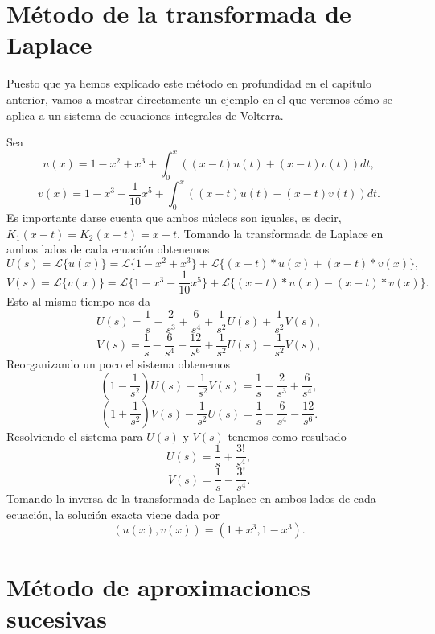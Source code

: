 \section{Método de la transformada de Laplace}
Puesto que ya hemos explicado este método en profundidad en el capítulo anterior, vamos a mostrar directamente un ejemplo en el que veremos cómo se aplica a un sistema de ecuaciones integrales de Volterra.
\begin{ejemplo}
	Sea
	\begin{equation}
		u(x) = 1 - x^2 + x^3 + \int_{0}^{x}((x-t)u(t) + (x-t)v(t))dt,
	\end{equation}
	\begin{equation}
		v(x) = 1 - x^3 - \dfrac{1}{10}x^5 + \int_{0}^{x}((x-t)u(t) - (x-t)v(t))dt.
	\end{equation}
	Es importante darse cuenta que ambos núcleos son iguales, es decir, $K_1(x-t) = K_2(x-t) = x-t$. Tomando la transformada de Laplace en ambos lados de cada ecuación obtenemos
	\begin{equation}
		U(s) = \mathcal{L}\{u(x)\} = \mathcal{L}\{1 - x^2 + x^3\} + \mathcal{L}\{(x-t)\ast u(x) + (x-t) \ast v(x)\},
	\end{equation}
	\begin{equation}
		V(s) = \mathcal{L}\{v(x)\} = \mathcal{L}\{1 - x^3 - \dfrac{1}{10}x^5\} + 	\mathcal{L}\{(x-t)\ast u(x) - (x-t) \ast v(x)\}.
	\end{equation}
	Esto al mismo tiempo nos da
	\begin{equation}
		U(s) = \dfrac{1}{s} - \dfrac{2}{s^3} + \dfrac{6}{s^4} + \dfrac{1}{s^2}U(s) + \dfrac{1}{s^2}V(s),
	\end{equation}
	\begin{equation}
		V(s) = \dfrac{1}{s} - \dfrac{6}{s^4} - \dfrac{12}{s^6} + \dfrac{1}{s^2}U(s) 	- \dfrac{1}{s^2}V(s),
	\end{equation}
	Reorganizando un poco el sistema obtenemos
	\begin{equation}
		(1-\dfrac{1}{s^2})U(s) - \dfrac{1}{s^2}V(s) = \dfrac{1}{s} - \dfrac{2}{s^3} + \dfrac{6}{s^4},
	\end{equation}
	\begin{equation}
		(1+\dfrac{1}{s^2})V(s) - \dfrac{1}{s^2}U(s) = \dfrac{1}{s} - \dfrac{6}{s^4}	- \dfrac{12}{s^6}.
	\end{equation}
	Resolviendo el sistema para $U(s)$ y $V(s)$ tenemos como resultado
	\begin{equation}
		U(s) = \dfrac{1}{s} + \dfrac{3!}{s^4},
	\end{equation}
	\begin{equation}
		V(s) = \dfrac{1}{s} - \dfrac{3!}{s^4}.
	\end{equation}
	Tomando la inversa de la transformada de Laplace en ambos lados de cada ecuación, la solución exacta viene dada por
	\begin{equation}
		(u(x),v(x)) = (1 + x^3, 1 - x^3).
	\end{equation}
\end{ejemplo}

\section{Método de aproximaciones sucesivas}

\endinput
